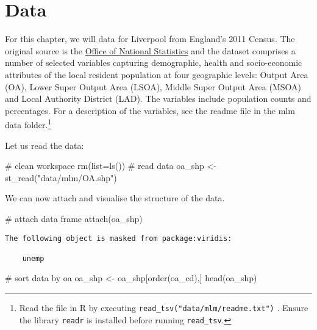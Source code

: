 \documentclass[
  letterpaper,
  krantz2]{style/krantz}
\newenvironment{Shaded}{\begin{snugshade}}{\end{snugshade}}
\newcommand{\AttributeTok}[1]{\textcolor[rgb]{0.40,0.45,0.13}{#1}}
\newcommand{\CommentTok}[1]{\textcolor[rgb]{0.37,0.37,0.37}{#1}}
\newcommand{\FunctionTok}[1]{\textcolor[rgb]{0.28,0.35,0.67}{#1}}
\newcommand{\NormalTok}[1]{\textcolor[rgb]{0.00,0.23,0.31}{#1}}
\newcommand{\OtherTok}[1]{\textcolor[rgb]{0.00,0.23,0.31}{#1}}
\newcommand{\StringTok}[1]{\textcolor[rgb]{0.13,0.47,0.30}{#1}}
\begin{document}
\hypertarget{data-3}{%
\section{Data}\label{data-3}}

For this chapter, we will data for Liverpool from England's 2011 Census.
The original source is the
\href{https://www.nomisweb.co.uk/home/census2001.asp}{Office of National
Statistics} and the dataset comprises a number of selected variables
capturing demographic, health and socio-economic attributes of the local
resident population at four geographic levels: Output Area (OA), Lower
Super Output Area (LSOA), Middle Super Output Area (MSOA) and Local
Authority District (LAD). The variables include population counts and
percentages. For a description of the variables, see the readme file in
the mlm data folder.\footnote{Read the file in R by executing
  \texttt{read\_tsv("data/mlm/readme.txt")} . Ensure the library
  \texttt{readr} is installed before running \texttt{read\_tsv}.}

Let us read the data:

\begin{Shaded}
\begin{Highlighting}[]
\CommentTok{\# clean workspace}
\FunctionTok{rm}\NormalTok{(}\AttributeTok{list=}\FunctionTok{ls}\NormalTok{())}
\CommentTok{\# read data}
\NormalTok{oa\_shp }\OtherTok{\textless{}{-}} \FunctionTok{st\_read}\NormalTok{(}\StringTok{"data/mlm/OA.shp"}\NormalTok{)}
\end{Highlighting}
\end{Shaded}

We can now attach and visualise the structure of the data.

\begin{Shaded}
\begin{Highlighting}[]
\CommentTok{\# attach data frame}
\FunctionTok{attach}\NormalTok{(oa\_shp)}
\end{Highlighting}
\end{Shaded}

\begin{verbatim}
The following object is masked from package:viridis:

    unemp
\end{verbatim}

\begin{Shaded}
\begin{Highlighting}[]
\CommentTok{\# sort data by oa}
\NormalTok{oa\_shp }\OtherTok{\textless{}{-}}\NormalTok{ oa\_shp[}\FunctionTok{order}\NormalTok{(oa\_cd),]}
\FunctionTok{head}\NormalTok{(oa\_shp)}
\end{Highlighting}
\end{Shaded}
\end{document}

